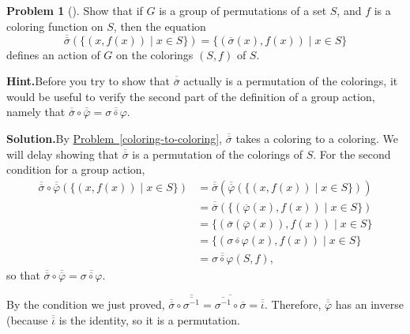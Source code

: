 \documentclass[10pt,]{book}
\theoremstyle{plain}
\theoremstyle{definition}
\newtheorem{activity}[project]{Problem}
\theoremstyle{definition}
\numberwithin{equation}{chapter}
\begin{document}
\begin{activity}[]\label{activity-286}
Show that if \(G\) is a group of permutations of a set \(S\), and \(f\) is a coloring function on \(S\), then the equation%
\begin{equation*}
\overline{\overline{\sigma}}(\{(x,f(x))\mid x\in S\}) = \{(\overline{\sigma}(x),f(x))\mid x\in S\}
\end{equation*}
defines an action of \(G\) on the colorings \((S,f)\) of \(S\).%
\par\medskip\noindent%
\textbf{Hint.}\quad Before you try to show that \(\overline{\overline{\sigma}}\) actually is a permutation of the colorings, it would be useful to verify the second part of the definition of a group action, namely that \(\overline{\overline{\sigma}}\circ\overline{\overline{\varphi}} = \overline{\overline{\sigma\circ\varphi}}\).%
\par\medskip\noindent%
\textbf{Solution.}\quad By \hyperref[coloring-to-coloring]{Problem~\ref{coloring-to-coloring}}, \(\overline{\overline{\sigma}}\) takes a coloring to a coloring. We will delay showing that \(\overline{\overline{\sigma}}\) is a permutation of the colorings of \(S\). For the second condition for a group action,%
\begin{align*}
\overline{\overline{\sigma}}\circ \overline{\overline{\varphi}}(\{(x,f(x))\mid x\in S\}) &= \overline{\overline{\sigma}}(\overline{\overline{\varphi}}(\{(x,f(x))\mid x\in S\}))\\
& = \overline{\overline{\sigma}}(\{(\overline{\varphi}(x),f(x))\mid x\in S\})\\
& = \{(\overline{\sigma}(\overline{\varphi}(x)),f(x))\mid x\in S\}\\
& = \{(\overline{\sigma\circ\varphi}(x),f(x))\mid x\in S\}\\
& = \overline{\overline{\sigma\circ\varphi}}(S,f)\text{,}
\end{align*}
so that \(\overline{\overline{\sigma}}\circ\overline{\overline{\varphi}} = \overline{\overline{\sigma\circ\varphi}}\).%
\par
By the condition we just proved, \(\overline{\overline{\sigma}}\circ\overline{\overline{\sigma^{-1}}} = \overline{\overline{\sigma^{-1}}\circ\overline{\sigma}} = \overline{\overline{\iota}}\). Therefore, \(\overline{\overline{\varphi}}\) has an inverse (because \(\overline{\overline{\iota}}\) is the identity, so it is a permutation.%
\end{activity}
\typeout{************************************************}
\typeout{************************************************}
\end{document}
